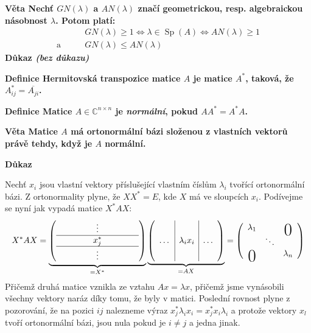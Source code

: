 \documentclass[a4paper,12pt,titlepage]{article}
\newcommand{\dk}{\smallskip\noindent\bf Důkaz\rm{} }
\newcommand{\df}{\smallskip\noindent\bf Definice\rm{} }
\newcommand{\vt}{\smallskip\noindent\bf Věta\rm{} }
\newcommand{\C}{\mathbb{C}}
\DeclareMathOperator{\Sp}{Sp}
\newcommand\bigzero{\makebox(0,0){\text{\huge0}}}
\begin{document}
\vt Nechť $GN(\lambda)$ a $AN(\lambda)$ značí geometrickou, resp. algebraickou násobnost $\lambda$. Potom platí:
\begin{align}
&GN(\lambda) \geq 1 \Leftrightarrow \lambda \in \Sp(A) \Leftrightarrow AN(\lambda) \geq 1\\
\text{a}\qquad &GN(\lambda) \leq AN(\lambda)
\end{align}
\dk {\it (bez důkazu)}

\df Hermitovská transpozice matice $A$ je matice $A^*$, taková, že $A_{ij}^* = \overline{A_{ji}}$.

\df Matice $A \in \C^{n\times n}$ je {\it normální}, pokud $AA^* = A^*A$.

\vt Matice $A$ má ortonormální bázi složenou z vlastních vektorů právě tehdy, když je $A$ normální.

\dk \begin{description}
	\item \uv{$\Rightarrow$} Nechť $x_i$ jsou vlastní vektory příslušející vlastním číslům $\lambda_i$ tvořící ortonormální bázi. Z ortonormality plyne, že $XX^*=E$, kde $X$ má ve sloupcích $x_i$. Podívejme se nyní jak vypadá matice $X^* A X$:
	\begin{align}
		X^* A X = 
		\underbrace{
		\left(\begin{array}{ccc} &\vdots &\\ \hline \hspace{1cm}& x_j^* & \hspace{1cm}\\ \hline&\vdots& \end{array}\right)}_{=X^*} 
		\underbrace{\left(\begin{array}{c|c|c} \raisebox{5mm}{\ } & &\\ \dots& \lambda_i x_i & \dots\\\raisebox{5mm}{\ }  && \end{array}\right)}_{=AX}
		= \left(\begin{array}{ccc}\lambda_1 &&\bigzero \\ &\ddots & \\ \bigzero&&\lambda_n\end{array}\right)
	\end{align}
	Přičemž druhá matice vznikla ze vztahu $Ax=\lambda x$, přičemž jsme vynásobili všechny vektory naráz díky tomu, že byly v matici. Poslední rovnost plyne z pozorování, že na pozici $ij$ nalezneme výraz $x_j^*\lambda_i x_i = x_j^* x_i \lambda_i$ a protože vektory $x_l$ tvoří ortonormální bázi, jsou nula pokud je $i\neq j$ a jedna jinak.


\end{description}
\end{document}
